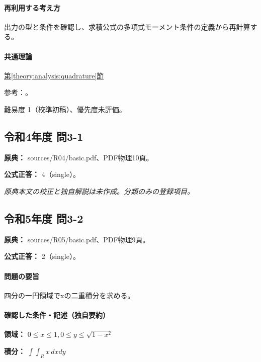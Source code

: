 \paragraph{再利用する考え方} 出力の型と条件を確認し、求積公式の多項式モーメント条件の定義から再計算する。

\paragraph{共通理論} \hyperref[theory:analysis:quadrature]{第\ref*{theory:analysis:quadrature}節}

\par 参考：\cite{nist_quadrature}。

\par 難易度 1（校準初稿）、優先度未評価。

\subsection{令和4年度 問3-1}
\label{q:r04-reg-basic-3-1}

\noindent\textbf{原典：} sources/R04/basic.pdf、PDF物理10頁。

\textbf{公式正答：} 4（single）。

\par\textit{原典本文の校正と独自解説は未作成。分類のみの登録項目。}

\subsection{令和5年度 問3-2}
\label{q:r05-reg-basic-3-2}

\noindent\textbf{原典：} sources/R05/basic.pdf、PDF物理9頁。

\textbf{公式正答：} 2（single）。

\paragraph{問題の要旨} 四分の一円領域でxの二重積分を求める。

\paragraph{確認した条件・記述（独自要約）}\mbox{}\par

\noindent\textbf{領域：} \(0\le x\le1,0\le y\le\sqrt{1-x^2}\)\par

\noindent\textbf{積分：} \(\int\int_R x\,dxdy\)\par

